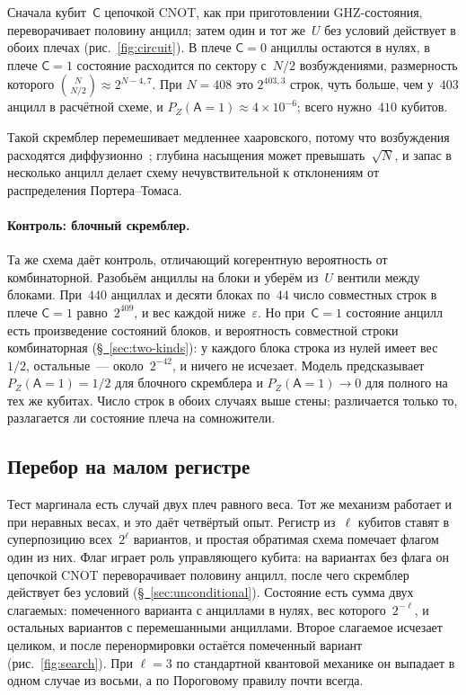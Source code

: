 \documentclass[11pt,a4paper]{article}
\newcommand{\qC}{\mathsf{C}}
\newcommand{\qA}{\mathsf{A}}
\newcommand{\CollapseRuleD}{Пороговому правилу}
\begin{document}
Сначала кубит~$\qC$ цепочкой CNOT, как при приготовлении GHZ-состояния, переворачивает половину анцилл; затем один и тот же~$U$ без условий действует в обоих плечах (рис.~\ref{fig:circuit}). В плече $\qC=0$ анциллы остаются в нулях, в плече $\qC=1$ состояние расходится по сектору с~$N/2$ возбуждениями, размерность которого $\binom{N}{N/2}\approx2^{N-4{,}7}$. При $N=408$ это $2^{403{,}3}$ строк, чуть больше, чем у~$403$ анцилл в расчётной схеме, и $P_Z(\qA{=}1)\approx4\times10^{-6}$; всего нужно~$410$ кубитов.

Такой скремблер перемешивает медленнее хааровского, потому что возбуждения расходятся диффузионно~\cite{khemani2018,rakovszky2018}; глубина насыщения может превышать~$\sqrt N$, и запас в несколько анцилл делает схему нечувствительной к отклонениям от распределения Портера--Томаса.

\paragraph{Контроль: блочный скремблер.}
Та же схема даёт контроль, отличающий когерентную вероятность от комбинаторной. Разобьём анциллы на блоки и уберём из~$U$ вентили между блоками. При~$440$ анциллах и десяти блоках по~$44$ число совместных строк в плече $\qC=1$ равно~$2^{409}$, и вес каждой ниже~$\varepsilon$. Но при~$\qC=1$ состояние анцилл есть произведение состояний блоков, и вероятность совместной строки комбинаторная (\hyperref[sec:two-kinds]{\S~\ref*{sec:two-kinds}}): у каждого блока строка из нулей имеет вес~$1/2$, остальные~--- около~$2^{-42}$, и ничего не исчезает. Модель предсказывает $P_Z(\qA{=}1)=1/2$ для блочного скремблера и $P_Z(\qA{=}1)\to0$ для полного на тех же кубитах. Число строк в обоих случаях выше стены; различается только то, разлагается ли состояние плеча на сомножители.

\subsection{Перебор на малом регистре}
\label{sec:small-search}

Тест маргинала есть случай двух плеч равного веса. Тот же механизм работает и при неравных весах, и это даёт четвёртый опыт. Регистр из~$\ell$ кубитов ставят в суперпозицию всех~$2^\ell$ вариантов, и простая обратимая схема помечает флагом один из них. Флаг играет роль управляющего кубита: на вариантах без флага он цепочкой CNOT переворачивает половину анцилл, после чего скремблер действует без условий (\hyperref[sec:unconditional]{\S~\ref*{sec:unconditional}}). Состояние есть сумма двух слагаемых: помеченного варианта с анциллами в нулях, вес которого~$2^{-\ell}$, и остальных вариантов с перемешанными анциллами. Второе слагаемое исчезает целиком, и после перенормировки остаётся помеченный вариант (рис.~\ref{fig:search}). При $\ell=3$ по стандартной квантовой механике он выпадает в одном случае из восьми, а по \CollapseRuleD{} почти всегда.
\end{document}

